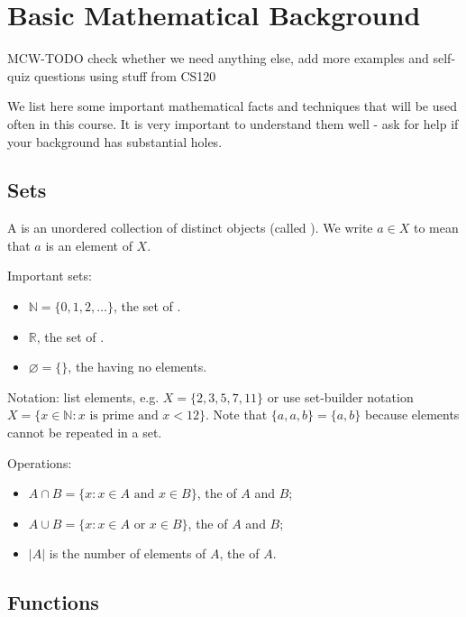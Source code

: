 \setcounter{chapter}{-1}
\chapter{Basic Mathematical Background}
\label{ch:app:mathtools}

MCW-TODO check whether we need anything else, add more examples and self-quiz questions using stuff from CS120

We list here some important mathematical facts and techniques  that will be used often in this course. It is very important to understand them well - ask for help if your background has substantial holes.

\section{Sets}

A  is an unordered collection of distinct objects (called ). We write $a\in X$ to mean that $a$ is an element of $X$.

Important sets: 
\begin{itemize}
\item $\mathbb{N} = \{0,1,2,\dots \}$, the set of .
\item $\mathbb{R}$, the set of .
\item $\varnothing = \{\}$, the  having no elements.
\end{itemize}

Notation: list elements, e.g. $X = \{2,3,5,7,11\}$ or use set-builder notation $X = \{x\in \mathbb{N} : \text{$x$ is prime and $x< 12$}\}$. Note that $\{a, a, b\} = \{a, b\}$ because elements cannot be repeated in a set.

Operations: 
\begin{itemize}
\item $A\cap B = \{x: x\in A \text{ and } x\in B\}$, the  of $A$ and $B$;
\item $A\cup B = \{x: x\in A \text{ or  } x\in B\}$, the  of $A$ and $B$;
\item $|A|$ is the number of elements of $A$, the  of $A$.
\end{itemize}


\section{Functions}

